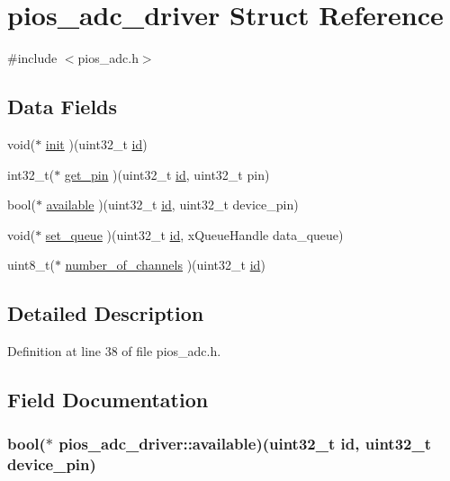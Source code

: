 \hypertarget{structpios__adc__driver}{\section{pios\-\_\-adc\-\_\-driver \-Struct \-Reference}
\label{structpios__adc__driver}
}


{\ttfamily \#include $<$pios\-\_\-adc.\-h$>$}

\subsection*{\-Data \-Fields}
\begin{DoxyCompactItemize}
\item 
void($\ast$ \hyperlink{structpios__adc__driver_aaea796c74764bf59704fb8b2714bcf3b}{init} )(uint32\-\_\-t \hyperlink{uavobjectmanager_8c_abaabdc509cdaba7df9f56c6c76f3ae19}{id})
\item 
int32\-\_\-t($\ast$ \hyperlink{structpios__adc__driver_ad310fb99761e7717588d465bf65db8de}{get\-\_\-pin} )(uint32\-\_\-t \hyperlink{uavobjectmanager_8c_abaabdc509cdaba7df9f56c6c76f3ae19}{id}, uint32\-\_\-t pin)
\item 
bool($\ast$ \hyperlink{structpios__adc__driver_a78f4f316d7ca3c5feafa158bef5b3895}{available} )(uint32\-\_\-t \hyperlink{uavobjectmanager_8c_abaabdc509cdaba7df9f56c6c76f3ae19}{id}, uint32\-\_\-t device\-\_\-pin)
\item 
void($\ast$ \hyperlink{structpios__adc__driver_a126055ec2d326eeb21161f08d30bf395}{set\-\_\-queue} )(uint32\-\_\-t \hyperlink{uavobjectmanager_8c_abaabdc509cdaba7df9f56c6c76f3ae19}{id}, x\-Queue\-Handle data\-\_\-queue)
\item 
uint8\-\_\-t($\ast$ \hyperlink{structpios__adc__driver_a3d56e6c3f7a8a40265cc5a685fb1debc}{number\-\_\-of\-\_\-channels} )(uint32\-\_\-t \hyperlink{uavobjectmanager_8c_abaabdc509cdaba7df9f56c6c76f3ae19}{id})
\end{DoxyCompactItemize}


\subsection{\-Detailed \-Description}


\-Definition at line 38 of file pios\-\_\-adc.\-h.



\subsection{\-Field \-Documentation}
\hypertarget{structpios__adc__driver_a78f4f316d7ca3c5feafa158bef5b3895}{
\subsubsection[{available}]{\setlength{\rightskip}{0pt plus 5cm}bool($\ast$ {\bf pios\-\_\-adc\-\_\-driver\-::available})(uint32\-\_\-t {\bf id}, uint32\-\_\-t device\-\_\-pin)}}\label{structpios__adc__driver_a78f4f316d7ca3c5feafa158bef5b3895}


